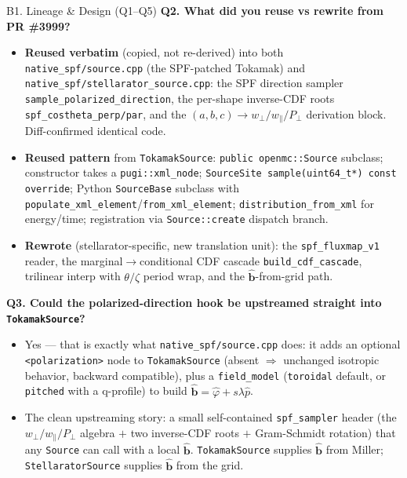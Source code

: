 \documentclass[11pt,aspectratio=169]{beamer}
\newcommand{\bhat}{\hat{\mathbf{b}}}
\newcommand{\qitem}[1]{\medskip\textbf{#1}\par}
\begin{document}
\begin{frame}[allowframebreaks]{B1. Lineage \& Design (Q1--Q5)}
\qitem{Q2. What did you reuse vs rewrite from PR \#3999?}
\begin{itemize}
\item \textbf{Reused verbatim} (copied, not re-derived) into both \texttt{native\_spf/source.cpp}
      (the SPF-patched Tokamak) and \texttt{native\_spf/stellarator\_source.cpp}: the SPF
      direction sampler \texttt{sample\_polarized\_direction}, the per-shape inverse-CDF roots
      \texttt{spf\_costheta\_perp/par}, and the $(a,b,c) \to w_\perp/w_\parallel/P_\perp$
      derivation block. Diff-confirmed identical code.
\item \textbf{Reused pattern} from \texttt{TokamakSource}: \texttt{public openmc::Source}
      subclass; constructor takes a \texttt{pugi::xml\_node};
      \texttt{SourceSite sample(uint64\_t*) const override}; Python \texttt{SourceBase}
      subclass with \texttt{populate\_xml\_element}/\texttt{from\_xml\_element};
      \texttt{distribution\_from\_xml} for energy/time; registration via
      \texttt{Source::create} dispatch branch.
\item \textbf{Rewrote} (stellarator-specific, new translation unit): the
      \texttt{spf\_fluxmap\_v1} reader, the marginal$\to$conditional CDF cascade
      \texttt{build\_cdf\_cascade}, trilinear interp with $\theta/\zeta$ period wrap, and the
      $\bhat$-from-grid path.
\end{itemize}

\framebreak
\qitem{Q3. Could the polarized-direction hook be upstreamed straight into \texttt{TokamakSource}?}
\begin{itemize}
\item Yes --- that is exactly what \texttt{native\_spf/source.cpp} does: it adds an optional
      \texttt{<polarization>} node to \texttt{TokamakSource} (absent $\Rightarrow$ unchanged
      isotropic behavior, backward compatible), plus a \texttt{field\_model}
      (\texttt{toroidal} default, or \texttt{pitched} with a q-profile) to build
      $\bhat = \hat\varphi + s\lambda\hat p$.
\item The clean upstreaming story: a small self-contained \texttt{spf\_sampler} header (the
      $w_\perp/w_\parallel/P_\perp$ algebra $+$ two inverse-CDF roots $+$ Gram-Schmidt
      rotation) that any \texttt{Source} can call with a local $\bhat$. \texttt{TokamakSource}
      supplies $\bhat$ from Miller; \texttt{StellaratorSource} supplies $\bhat$ from the grid.
\end{itemize}


\end{frame}
\end{document}
